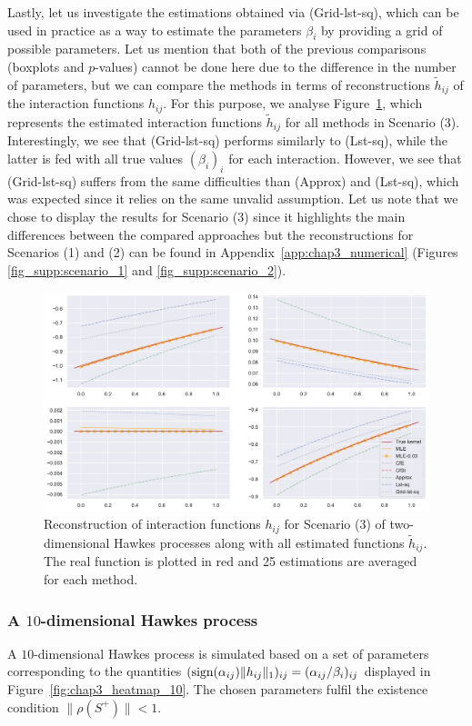      Lastly, let us investigate the estimations obtained via (Grid-lst-sq), which can be used in practice as a way to estimate the parameters $\beta_i$ by providing a grid of possible parameters.
     Let us mention that both of the previous comparisons (boxplots and \(p\)-values) cannot be done here due to the difference in the number of parameters, but we can compare the methods in terms of
     reconstructions $\tilde h_{ij}$ of the interaction functions $h_{ij}$.
     For this purpose, we analyse Figure~\ref{fig:chap3_reconstruction_param_1}, which represents the estimated interaction functions \(\tilde h_{ij}\) for all methods in Scenario (3).
     Interestingly, we see that (Grid-lst-sq) performs similarly to (Lst-sq),
     while the latter is fed with all true values \((\beta_i)_i\) for each interaction.
     However, we see that (Grid-lst-sq)  suffers from the same difficulties than (Approx) and (Lst-sq), which was expected since it relies on the same unvalid assumption.
     Let us note that we chose to display the results for Scenario (3) since it highlights the main differences between the compared approaches but the reconstructions for Scenarios (1) and (2)
     can be found in Appendix~\ref{app:chap3_numerical}
     (Figures \ref{fig_supp:scenario_1} and \ref{fig_supp:scenario_2}).
     
     {\begin{figure}[!ht]
     \centering
     \includegraphics[width=0.9\linewidth]{images/chapter3/reconstruction_param_3.pdf}
     \caption{Reconstruction of interaction functions $h_{ij}$ for Scenario (3) of two-dimensional Hawkes processes along with all estimated functions $\tilde h_{ij}$. The real function is plotted in red and 25 estimations are averaged for each method.}
     \label{fig:chap3_reconstruction_param_1}
     \end{figure}}


  \subsubsection{A $10$-dimensional Hawkes process}
    A \(10\)-dimensional Hawkes process is simulated based on a set of parameters corresponding to the quantities $(\operatorname{sign}(\alpha_{ij})\|h_{ij}\|_1)_{ij} = (\alpha_{ij}/\beta_i)_{ij}$ displayed in Figure~\ref{fig:chap3_heatmap_10}.
    The chosen parameters fulfil the existence condition $\|\rho(S^+)\| < 1$.

